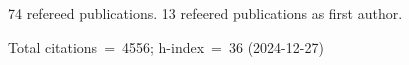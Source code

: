 74 refereed publications. 13 refeered publications as first author.

Total citations~=~4556; h-index~=~36 (2024-12-27)